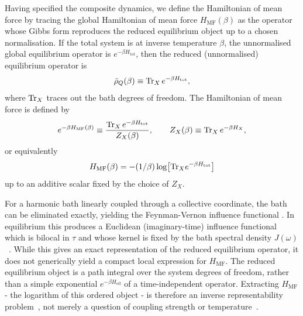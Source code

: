 Having specified the composite dynamics, we define the Hamiltonian of mean force by tracing the global Hamiltonian of mean force $H_{\mathrm{MF}}(\beta)$ as the operator whose Gibbs
form reproduces the reduced equilibrium object up to a chosen normalisation. If
the total system is at inverse temperature $\beta$, the unnormalised global
equilibrium operator is $e^{-\beta H_{\mathrm{tot}}}$, then the reduced
(unnormalised) equilibrium operator is
\begin{equation}
    \bar{\rho}_Q(\beta)\equiv \mathrm{Tr}_X\, e^{-\beta H_{\mathrm{tot}}},
    \label{eq:reduced_equilibrium_operator}
\end{equation}
where $\mathrm{Tr}_X$ traces out the bath degrees of freedom. The Hamiltonian of mean
force is defined by
\begin{equation}
    e^{-\beta H_{\mathrm{MF}}(\beta)}
    \equiv
    \frac{\mathrm{Tr}_X\, e^{-\beta H_{\mathrm{tot}}}}{Z_X(\beta)},
    \qquad
    Z_X(\beta)\equiv \mathrm{Tr}_X\, e^{-\beta H_X},
    \label{eq:HMF_def}
\end{equation}
or equivalently
\begin{equation}
H_{\mathrm{MF}}(\beta)=-(1/\beta)\log\!\big[\mathrm{Tr}_X e^{-\beta H_{\mathrm{tot}}}\big]
\end{equation}
up to an additive scalar fixed by the choice of $Z_X$.

For a harmonic bath linearly coupled through a collective coordinate, the bath
can be eliminated exactly, yielding the Feynman-Vernon influence functional
\cite{feynmanTheoryGeneralQuantum1963a, grabertQuantumBrownianMotion1988, ingoldSpecificHeatAnomalies2009, hanggiFiniteQuantumDissipation2008}.
In equilibrium this produces a Euclidean (imaginary-time) influence functional
which is bilocal in $\tau$ and whose kernel is fixed by the bath spectral
density $J(\omega)$~\cite{moixEquilibriumreducedDensityMatrix2012, mccaulPartitionfreeApproachOpen2017c, mccaulDrivingSpinbosonModels2018a, mccaulHowWinFriends2021b}. While this gives an exact representation of the reduced equilibrium operator, it does not generically yield a compact local expression for $H_{\mathrm{MF}}$. The reduced equilibrium object is a path integral over the system degrees of freedom, rather than a
simple exponential $e^{-\beta H_{\mathrm{eff}}}$ of a time-independent operator.
Extracting $H_{\mathrm{MF}}$ - the logarithm of this ordered object - is
therefore an inverse representability problem~\cite{ColemanYukalov2000RDM,Mazziotti2007RDMMechanics,LiuChristandlVerstraete2007NRepQMA,Klyachko2006QuantumMarginal}, not merely a question of coupling
strength or temperature~\cite{talknerColloquiumStatisticalMechanics2020, hovhannisyanHamiltonianMeanForce2020}.


